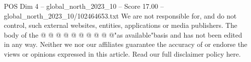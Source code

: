 \begin{textsample}{POS Dim 4 – global\_north\_2023\_10 – Score 17.00 – global\_north\_2023\_10/102464653.txt}
We are not responsible for, and do not control, such external websites, entities, applications or media publishers.
The body of the @ @ @ @ @ @ @ @ @ @"as available"basis and has not been edited in any way.
Neither we nor our affiliates guarantee the accuracy of or endorse the views or opinions expressed in this article.
Read our full disclaimer policy here.

\end{textsample}
